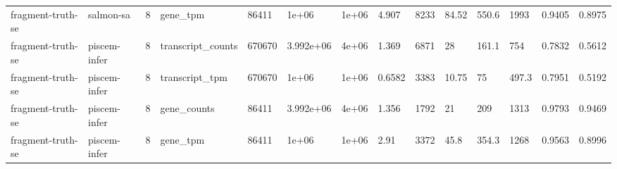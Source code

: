 \begin{tabular}{llllllllllllll}
fragment-truth-se & salmon-sa & 8 & gene\_tpm & 86411 & 1e+06 & 1e+06 & 4.907 & 8233 & 84.52 & 550.6 & 1993 & 0.9405 & 0.8975 \\
fragment-truth-se & piscem-infer & 8 & transcript\_counts & 670670 & 3.992e+06 & 4e+06 & 1.369 & 6871 & 28 & 161.1 & 754 & 0.7832 & 0.5612 \\
fragment-truth-se & piscem-infer & 8 & transcript\_tpm & 670670 & 1e+06 & 1e+06 & 0.6582 & 3383 & 10.75 & 75 & 497.3 & 0.7951 & 0.5192 \\
fragment-truth-se & piscem-infer & 8 & gene\_counts & 86411 & 3.992e+06 & 4e+06 & 1.356 & 1792 & 21 & 209 & 1313 & 0.9793 & 0.9469 \\
fragment-truth-se & piscem-infer & 8 & gene\_tpm & 86411 & 1e+06 & 1e+06 & 2.91 & 3372 & 45.8 & 354.3 & 1268 & 0.9563 & 0.8996 \\
\bottomrule
\end{tabular}
